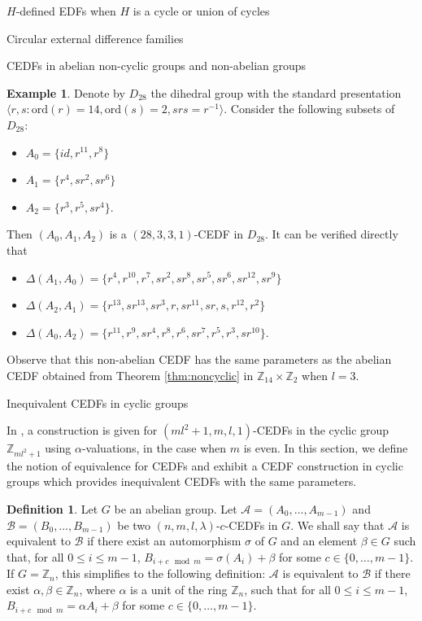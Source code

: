 \documentclass[12pt, a4paper]{article}
\theoremstyle{definition}
\newtheorem{example}[theorem]{Example}
\newtheorem{definition}[theorem]{Definition}
\begin{document}
\begin{section}{$H$-defined EDFs when $H$ is a cycle or union of cycles}
\begin{subsection}{Circular external difference families}
\begin{subsection}{CEDFs in abelian non-cyclic groups and non-abelian groups}
\begin{example}
Denote by $D_{28}$ the dihedral group with the standard presentation $\langle r,s: \mathrm{ord}(r)=14, \mathrm{ord}(s)=2, srs=r^{-1} \rangle$.  Consider the following subsets of $D_{28}$:  
\begin{itemize}
\item $A_0=\{id, r^{11}, r^8\}$
\item $A_1=\{ r^4,sr^2, sr^6\}$
\item $A_2=\{r^3,r^5, sr^4\}$.
\end{itemize}
Then $(A_0,A_1,A_2)$ is a $(28,3,3,1)$-CEDF in ${D}_{28}$.
It can be verified directly that
\begin{itemize}
\item $\Delta(A_1,A_0)=\{r^4,r^{10},r^7,sr^2, sr^8, sr^5, sr^6, sr^{12}, sr^9\}$
\item $\Delta(A_2,A_1)=\{r^{13}, sr^{13}, sr^3, r, sr^{11}, sr, s, r^{12}, r^2\}$
\item $\Delta(A_0,A_2)=\{r^{11}, r^9, sr^4, r^8, r^6, sr^{7}, r^5, r^3, sr^{10}\}$.
\end{itemize}
\end{example}
Observe that this non-abelian CEDF has the same parameters as the abelian CEDF obtained from Theorem \ref{thm:noncyclic} in $\mathbb{Z}_{14} \times \mathbb{Z}_2$ when $l=3$.
\end{subsection}

\begin{subsection}{Inequivalent CEDFs in cyclic groups}

In \cite{PatSti2}, a construction is given for $(ml^2+1,m,l,1)$-CEDFs in the cyclic group $\mathbb{Z}_{ml^2+1}$ using $\alpha$-valuations, in the case when $m$ is even.  In this section, we define the notion of equivalence for CEDFs and exhibit a CEDF construction in cyclic groups which provides inequivalent CEDFs with the same parameters.

\begin{definition}
Let $G$ be an abelian group. Let $\mathcal{A}=(A_0,\ldots, A_{m-1})$ and $\mathcal{B}=(B_0,\ldots, B_{m-1})$ be two $(n,m,l,\lambda)$-$c$-CEDFs in $G$. We shall say that $\mathcal{A}$ is equivalent to $\mathcal{B}$ if there exist an automorphism $\sigma$ of $G$ and an element $\beta \in G$ such that, for all $0 \leq i \leq m-1$, $B_{i+c \mod m}=\sigma(A_i) + \beta$ for some $c \in \{0,\ldots,m-1\}$.  If $G=\mathbb{Z}_n$, this simplifies to the following definition: $\mathcal{A}$ is equivalent to $\mathcal{B}$ if there exist $\alpha, \beta \in \mathbb{Z}_n$, where $\alpha$ is a unit of the ring $\mathbb{Z}_n$, such that for all $0 \leq i \leq m-1$, $B_{i+c \mod m}=\alpha A_i + \beta$ for some $c \in \{0,\ldots,m-1\}$.
\end{definition}


\end{subsection}
\end{subsection}
\end{section}
\end{document}
